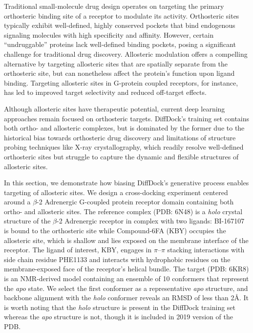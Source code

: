 \documentclass[%
 aip,
 amsmath,amssymb,
reprint,%
]{revtex4-1}
\begin{document}
Traditional small-molecule drug design operates on targeting the primary orthosteric binding site of a receptor to modulate its activity. Orthosteric sites typically exhibit well-defined, highly conserved pockets that bind endogenous signaling molecules with high specificity and affinity. \cite{nussinov2012different} However, certain ``undruggable'' proteins lack well-defined binding pockets, posing a significant challenge for traditional drug discovery. Allosteric modulation offers a compelling alternative by targeting allosteric sites that are spatially separate from the orthosteric site, but can nonetheless affect the protein's function upon ligand binding.\cite{Xie2023recent} Targeting allosteric sites in G-protein coupled receptors, for instance, has led to improved target selectivity and reduced off-target effects. \cite{nussinov2023alphafold}

Although allosteric sites have therapeutic potential, current deep learning approaches remain focused on orthosteric targets. DiffDock's training set contains both ortho- and allosteric complexes, but is dominated by the former due to the historical bias towards orthosteric drug discovery and limitations of structure probing techniques like X-ray crystallography, which readily resolve well-defined orthosteric sites but struggle to capture the dynamic and flexible structures of allosteric sites.\cite{vora2025fantastic} 

In this section, we demonstrate how biasing DiffDock's generative process enables targeting of allosteric sites. We design a cross-docking experiment centered around a $\beta$-2 Adrenergic G-coupled protein receptor domain containing both ortho- and allosteric sites. The reference complex (PDB: 6N48) is a \textit{holo} crystal structure of the $\beta$-2 Adrenergic receptor in complex with two ligands: BI-167107 is bound to the orthosteric site while Compound-6FA (KBY) occupies the allosteric site, which is shallow and lies exposed on the membrane interface of the receptor.\cite{liu2019mechanism} The ligand of interest, KBY, engages in $\pi$–$\pi$ stacking interactions with side chain residue PHE1133 and interacts with hydrophobic residues on the membrane-exposed face of the receptor’s helical bundle. The target (PDB: 6KR8) is an NMR-derived model containing an ensemble of 10 conformers that represent the \textit{apo} state.\cite{imai2020structural} We select the first conformer as a representative \textit{apo} structure, and  backbone alignment with the \textit{holo} conformer reveals an RMSD of less than 2{\AA}. It is worth noting that the \textit{holo} structure is present in the DiffDock training set whereas the \textit{apo} structure is not, though it is included in 2019 version of the PDB.
\end{document}
